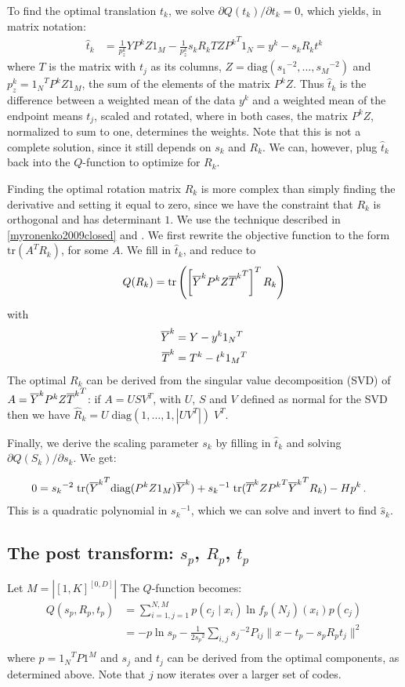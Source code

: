 To find the optimal translation $t_k$, we solve $\partial Q(t_k)/\partial t_k = 0$, which yields, in matrix notation:
\begin{align*}
\hat t_k &= \frac{1}{p^k_z}YP^kZ1_M - \frac{1}{p^k_z}s_kR_kTZ{P^k}^T1_N = y^k - s_kR_k t^k
\end{align*} 
where $T$ is the matrix with $t_j$ as its columns, $Z = \text{diag}({s_1}^{-2}, \ldots, {s_M}^{-2})$ and ${p^k_z} = {1_N}^TP^kZ1_M$, the sum of the elements of the matrix $P^kZ$. Thus $\hat t_k$ is the difference between a weighted mean of the data $y^k$ and a weighted mean of the endpoint means $t_j$, scaled and rotated, where in both cases, the matrix  $P^kZ$, normalized to sum to one, determines the weights. Note that this is not a complete solution, since it still depends on $s_k$ and $R_k$. We can, however, plug $\hat t_k$ back into the $Q$-function to optimize for $R_k$.

Finding the optimal rotation matrix $R_k$ is more complex than simply finding the derivative and setting it equal to zero, since we have the constraint that $R_k$ is orthogonal and has determinant $1$. We use the technique described in \ref{myronenko2009closed} and \cite[Lemma~1]{myronenko2010point}. We first rewrite the objective function to the form $\text{tr}(A^TR_k)$, for some $A$. We fill in $\hat t_k$, and reduce to
\[ 
Q(R_k) = \text{tr}\left(\left[\overline{Y}^kP^kZ{\overline{T}^k}^T\right]^TR_k\right) 
\]
with 
\begin{align*}
\overline{Y}^k &= Y - y^k {1_N}^T\\
\overline{T}^k &= T^k - t^k {1_M}^T\\
\end{align*}
The optimal $R_k$ can be derived from the singular value decomposition (SVD) of $A=\overline{Y}^kP^kZ{\overline{T}^k}^T$: if $A = USV^T$, with $U$, $S$ and $V$ defined as normal for the SVD then we have $\hat R_k = U \;\text{diag} (1, \ldots, 1, |UV^T|)\; V^T$.

Finally, we derive the scaling parameter $s_k$ by filling in $\hat t_k$ and solving $\partial Q(S_k)/\partial s_k$. We get:

\begin{align*}
0 &= {s_k}^{-2}\;\text{tr}({\overline{Y}^k}^T\text{diag}(P^kZ1_M)\overline{Y}^k) + {s_k}^{-1}\;\text{tr}(\overline{T}^kZ{P^k}^T{\overline{Y}^k}^TR_k) -H p^k \,\text{.}
\end{align*}
This is a quadratic polynomial in ${s_k}^{-1}$, which we can solve and invert to find $\hat s_k$.

\subsection{The post transform: $s_p$, $R_p$, $t_p$} Let $M = \left |[1,K]^{[0,D]}\right|$ The $Q$-function becomes:
\begin{align*}
Q(s_p, R_p, t_p) &= \sum_{i=1,j=1}^{N,M} p(c_j\mid x_i) \ln f_p(N_j)(x_i) p(c_j) \\
&= - p\ln s_p  - \frac{1}{2 {s_p}^2} \sum_{i, j} {s_j}^{-2} P_{ij} \| x - t_p -s_pR_pt_j \|^2 \\
\end{align*}
where $p = {1_N}^T P 1^M$ and $s_j$ and $t_j$ can be derived from the optimal components, as determined above. Note that $j$ now iterates over a larger set of codes.

